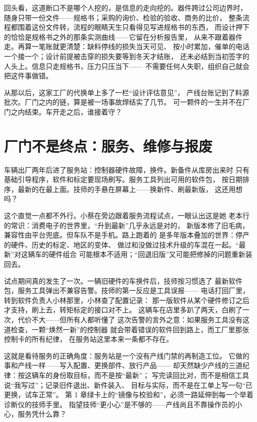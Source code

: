 回头看，这道断口不是哪个人挖的，是信息的走向挖的。器件跨过公司边界时，
随身只带一份文件——规格书；采购的询价、检验的验收、商务的比价，
整条流程都围着这份文件转，流程的眼睛天生只看得见写进规格书的东西，
而设计押下的恰恰是规格书之外的那条实测曲线——它留在分析报告里，
从来不跟着器件走。再算一笔账就更清楚：缺料停线的损失当天可见、
按小时累加，催单的电话一个接一个；设计前提被击穿的损失要等到冬天才结账，
还未必结到当初签字的人头上。信息只走规格书，压力只压当下——
不需要任何人失职，组织自己就会把这件事做错。

从那以后，这家工厂的代换单上多了一栏“设计评估意见”，
产线台账记到了料源批次。厂门之内的链，算是被一场事故焊结实了几节。
可一颗件的一生并不在厂门之内结束。车开走之后，谁接着守？

\section{厂门不是终点：服务、维修与报废}

车辆出厂两年后进了服务站：控制器硬件故障，换件。新备件从库房出来时
只有基础引导程序，软件和标定要现场刷写。服务工具列出可用的软件包，
按日期排序，最新的在最上面。技师的手悬在屏幕上——换新件、刷最新版，
这还用想吗？

这个直觉一点都不外行。小蔡在旁边跟着服务流程试点，一眼认出这是她
老本行的常识：消费电子的世界里，“升到最新”几乎永远是对的，
新版本修了旧毛病，兼容性由平台兜底。但车队不是手机。路上跑着的
是多年版本叠加的世界：停产的硬件、历史的标定、地区的变体、
做过和没做过技术升级的车混在一起。“最新”对这辆车的硬件组合
可能根本不适用；“回退旧版”又可能把修掉的问题重新装回去。

试点期间真的发生了一次。一辆旧硬件的车换件后，技师按习惯选了
最新软件包，服务工具弹出不兼容告警。技师的第一反应是工具误报——
电话打回厂里，转到软件负责人小林那里，小林查了配置记录：
那一版软件从某个硬件修订之后才支持，刷上去，转矩标定的接口对不上。
这辆车在店里多趴了两天，白刷了一次，代价不大——但所有人都听懂了
这次告警的言外之意：如果服务工具没有这道检查，一颗“焕然一新”的控制器
就会带着错误的软件回到路上，而工厂里那张控制卡的所有纪律，
在服务站这里本来一条都不存在。

这就是看待服务的正确角度：服务站是一个没有产线门禁的再制造工位。
它做的事和产线一样——写入配置、更换部件、放行产品——
却天然缺少产线的三道纪律：按这辆车的身份取目标，而不是按“最新”；
写完读回比对，而不是相信工具说“我写过”；记录旧件退出、新件装入、
目标与实际，而不是在工单上写一句“已更换，试车正常”。
第 1 章绿卡上的“镜像与校验和”，必须一路延伸到每一个举着诊断仪的技师手里。
指望技师“更小心”是不够的——产线尚且不靠操作员的小心，服务凭什么靠？

